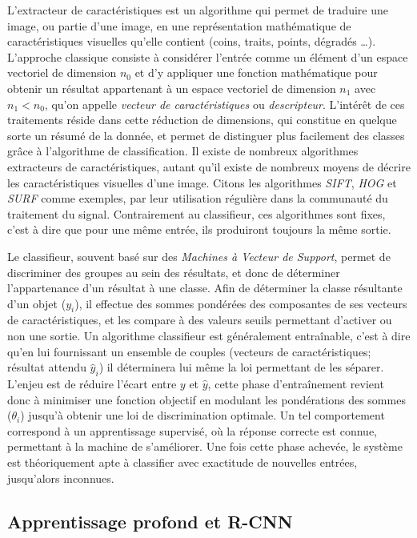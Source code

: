 			L'extracteur de caractéristiques est un algorithme qui permet de traduire une image, ou partie d'une image, en une représentation mathématique de caractéristiques visuelles qu'elle contient (coins, traits, points, dégradés \dots). L'approche classique consiste à considérer l'entrée comme un élément d'un espace vectoriel de dimension $n_{0}$ et d'y appliquer une fonction mathématique pour obtenir un résultat appartenant à un espace vectoriel de dimension $n_{1}$ avec $n_{1} < n_{0}$, qu'on appelle \emph{vecteur de caractéristiques} ou \emph{descripteur}. L'intérêt de ces traitements réside dans cette réduction de dimensions, qui constitue en quelque sorte un résumé de la donnée, et permet de distinguer plus facilement des classes grâce à l'algorithme de classification. Il existe de nombreux algorithmes extracteurs de caractéristiques, autant qu'il existe de nombreux moyens de décrire les caractéristiques visuelles d'une image. Citons les algorithmes \emph{SIFT}\cite{sift}, \emph{HOG}\cite{hog} et \emph{SURF}\cite{surf} comme exemples, par leur utilisation régulière dans la communauté du traitement du signal. Contrairement au classifieur, ces algorithmes sont fixes, c'est à dire que pour une même entrée, ils produiront toujours la même sortie.
			\par
			Le classifieur, souvent basé sur des \emph{Machines à Vecteur de Support}\cite{svm}, permet de discriminer des groupes au sein des résultats, et donc de déterminer l'appartenance d'un résultat à une classe. Afin de déterminer la classe résultante d'un objet ($y_{i}$), il effectue des sommes pondérées des composantes de ses vecteurs de caractéristiques, et les compare à des valeurs seuils permettant d'activer ou non une sortie. Un algorithme classifieur est généralement entraînable, c'est à dire qu'en lui fournissant un ensemble de couples (vecteurs de caractéristiques; résultat attendu $\hat{y}_{i}$) il déterminera lui même la loi permettant de les séparer. L'enjeu est de réduire l'écart entre $y$ et $\hat{y}$, cette phase d'entraînement revient donc à minimiser une fonction objectif en modulant les pondérations des sommes ($\theta_{i}$) jusqu'à obtenir une loi de discrimination optimale. Un tel comportement correspond à un apprentissage supervisé, où la réponse correcte est connue, permettant à la machine de s'améliorer. Une fois cette phase achevée, le système est théoriquement apte à classifier avec exactitude de nouvelles entrées, jusqu'alors inconnues.

		\subsection{Apprentissage profond et R-CNN}
		\label{sub:neural}
		
